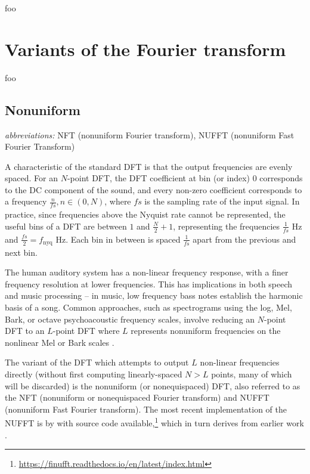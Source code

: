 \documentclass[letter,12pt]{article}
\begin{document}
foo

\section{Variants of the Fourier transform}

foo

\subsection{Nonuniform}

\qquad \textit{abbreviations:} NFT (nonuniform Fourier transform), NUFFT (nonuniform Fast Fourier Transform)

A characteristic of the standard DFT is that the output frequencies are evenly spaced. For an $N$-point DFT, the DFT coefficient at bin (or index) 0 corresponds to the DC component of the sound, and every non-zero coefficient corresponds to a frequency $\frac{n}{\mathit{fs}}, n \in (0, N)$, where $\mathit{fs}$ is the sampling rate of the input signal. In practice, since frequencies above the Nyquist rate cannot be represented, the useful bins of a DFT are between $1$ and $\frac{N}{2}+1$, representing the frequencies $\frac{1}{\mathit{fs}}$ Hz and $\frac{\mathit{fs}}{2} = f_{\text{nyq}}$ Hz. Each bin in between is spaced $\frac{1}{\mathit{fs}}$ apart from the previous and next bin.

The human auditory system has a non-linear frequency response, with a finer frequency resolution at lower frequencies.  This has implications in both speech and music processing -- in music, low frequency bass notes establish the harmonic basis of a song.  Common approaches, such as spectrograms using the log, Mel, Bark, or octave psychoacoustic frequency scales, involve reducing an $N$-point DFT to an $L$-point DFT where $L$ represents nonuniform frequencies on the nonlinear Mel or Bark scales .

The variant of the DFT which attempts to output $L$ non-linear frequencies directly (without first computing linearly-spaced $N > L$ points, many of which will be discarded) is the nonuniform (or nonequispaced) DFT, also referred to as the NFT (nonuniform or nonequispaced Fourier transform) and NUFFT (nonuniform Fast Fourier transform). The most recent implementation of the NUFFT is by \citet{nufft1} with source code available,\footnote{\href{https://finufft.readthedocs.io/en/latest/index.html}{https://finufft.readthedocs.io/en/latest/index.html}} which in turn derives from earlier work \cite{nufft2, nufft3}.
\end{document}
